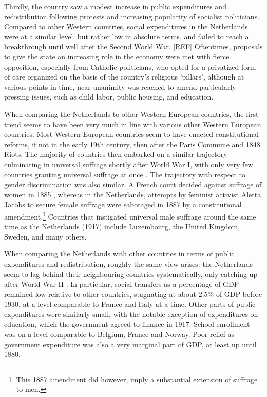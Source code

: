 Thirdly, the country saw a modest increase in public expenditures and redistribution following protests and increasing popularity of socialist politicians. Compared to other Western countries, social expenditures in the Netherlands were at a similar level, but rather low in absolute terms, and failed to reach a breakthrough until well after the Second World War. [REF] Oftentimes, proposals to give the state an increasing role in the economy were met with fierce opposition, especially from Catholic politicians, who opted for a privatized form of care organized on the basis of the country's religious 'pillars', although at various points in time, near unanimity was reached to amend particularly pressing issues, such as child labor, public housing, and education. \autocite{van2013eerste}

When comparing the Netherlands to other Western European countries,  the first trend seems to have been very much in line with various other Western European countries. Most Western European countries seem to have enacted constitutional reforms, if not in the early 19th century, then after the Paris Commune and 1848 Riots. The majority of countries then embarked on a similar trajectory culminating in universal suffrage shortly after World War I, with only very few countries granting universal suffrage at once \autocite{caramani2017elections}. The trajectory with respect to gender discrimination was also similar. A French court decided against suffrage of women in 1885 \autocite{przeworski2009conquered}, whereas in the Netherlands, attempts by feminist activist Aletta Jacobs to secure female suffrage were sabotaged in 1887 by a constitutional amendment.\footnote{This 1887 amendment did however, imply a substantial extension of suffrage to men.} Countries that instigated universal male suffrage around the same time as the Netherlands (1917) include Luxembourg, the United Kingdom, Sweden, and many others. \autocite{caramani2017elections}

When comparing the Netherlands with other countries in terms of public expenditures and redistribution, roughly the same view arises: the Netherlands seem to lag behind their neighbouring countries systematically, only catching up after World War II \autocite{lindert2004growing}. In particular, social transfers as a percentage of GDP remained low relative to other countries, stagnating at about 2.5\% of GDP before 1930, at a level comparable to France and Italy at a time. Other parts of public expenditures were similarly small, with the notable exception of expenditures on education, which the government agreed to finance in 1917. School enrollment was on a level comparable to Belgium, France and Norway. Poor relief as government expenditure was also a very marginal part of GDP, at least up until 1880. \autocite{van2000eenheiddstaat, lindert2004growing}

